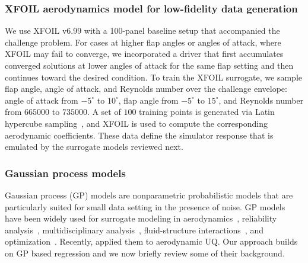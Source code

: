\documentclass[journal]{new-aiaa}
\begin{document}
\subsubsection{XFOIL aerodynamics model for low-fidelity data generation}
\label{sec:xfoil}
We use XFOIL v6.99 with a 100-panel baseline setup that accompanied the challenge problem. For cases at higher flap angles or angles of attack, where XFOIL may fail to converge, we incorporated a driver that first accumulates converged solutions at lower angles of attack for the same flap setting and then continues toward the desired condition. To train the XFOIL surrogate, we sample flap angle, angle of attack, and Reynolds number over the challenge envelope: angle of attack from $-5^\circ$ to $10^\circ$, flap angle from $-5^\circ$ to $15^\circ$, and Reynolds number from $665000$ to $735000$. A set of $100$ training points is generated via Latin hypercube sampling~\cite{loh1996latin}, and XFOIL is used to compute the corresponding aerodynamic coefficients. These data define the simulator response that is emulated by the surrogate models reviewed next.

\subsubsection{Gaussian process models}
Gaussian process (GP) models are nonparametric probabilistic models that are particularly suited for small data setting in the presence of noise. GP models have been widely used for surrogate modeling in aerodynamics~\cite{renganathan2021enhanced,ashwin2022data}, reliability analysis~\cite{renganathan2022multifidelity, renganathan2023camera,booth2025contour, renganathan2024efficient}, multidisciplinary analysis~\cite{yuan2026remal}, fluid-structure interactions~\cite{adhikary2026adaptive}, and optimization~\cite{carlson2025multiobjective, renganathan2025q,renganathan2021lookahead}. Recently, \citet{davis2026uncertainty} applied them to aerodynamic UQ. Our approach builds on GP based regression and we now briefly review some of their background.
\end{document}

